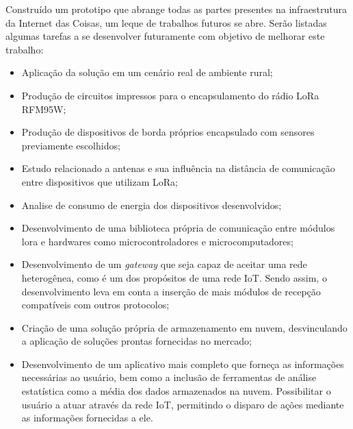 \documentclass[
    hidelinks,
	12pt,				%
	openany,
	oneside, 
	a4paper,			%
	english,			%
	french,				%
	spanish,			%
	brazil				%
	]{abntex2}
\begin{document}
Construído um prototipo que abrange todas as partes presentes na infraestrutura da Internet das Coisas, um leque de trabalhos futuros se abre. Serão listadas algumas tarefas a se desenvolver futuramente com objetivo de melhorar este trabalho:
\begin{itemize}
\item Aplicação da solução em um cenário real de ambiente rural;
\item Produção de circuitos impressos para o encapsulamento do rádio LoRa RFM95W;
\item Produção de dispositivos de borda próprios encapsulado com sensores previamente escolhidos;
\item Estudo relacionado a antenas e sua influência na distância de comunicação entre dispositivos que utilizam LoRa;
\item Analise de consumo de energia dos dispositivos desenvolvidos;
\item Desenvolvimento de uma biblioteca própria de comunicação entre módulos lora e hardwares como microcontroladores e microcomputadores;
\item Desenvolvimento de um \textit{gateway} que seja capaz de aceitar uma rede heterogênea, como é um dos propósitos de uma rede IoT. Sendo assim, o desenvolvimento leva em conta a inserção de mais módulos de recepção compatíveis com outros protocolos;
\item Criação de uma solução própria de armazenamento em nuvem, desvinculando a aplicação de soluções prontas fornecidas no mercado;
\item Desenvolvimento de um aplicativo mais completo que forneça as informações necessárias ao usuário, bem como a inclusão de ferramentas de análise estatística como a média dos dados armazenados na nuvem. Possibilitar o usuário a atuar através da rede IoT, permitindo o disparo de ações mediante as informações fornecidas a ele. 
\end{itemize}
\end{document}
